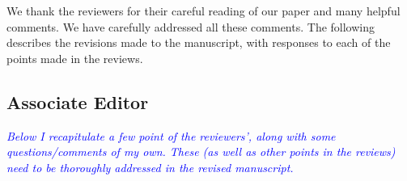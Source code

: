\documentclass[pdftex,12pt]{article}
\def\rc#1{{\it\textcolor{blue}{#1}}\smallskip}
\begin{document}
\vspace*{5pt}

We thank the reviewers for their careful reading of our paper and many
helpful comments. We have carefully addressed all these comments. The
following describes the revisions made to the manuscript, with 
responses to each of the points made in the reviews.

\subsection*{Associate Editor}

\rc{Below I recapitulate a few
point of the reviewers', along with some questions/comments of my own.
These (as well as other points in the reviews) need to be thoroughly
addressed in the revised manuscript.}
\end{document}
